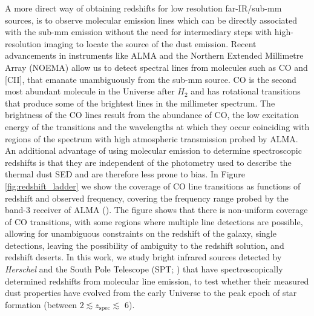 A more direct way of obtaining redshifts for low resolution far-IR/sub-mm sources, is to observe molecular emission lines which can be directly associated with the sub-mm emission without the need for intermediary steps with high-resolution imaging to locate the source of the dust emission. Recent advancements in instruments like ALMA and the Northern Extended Millimetre Array (NOEMA) allow us to detect spectral lines from molecules such as CO and [CII], that emanate unambiguously from the sub-mm source. CO is the second most abundant molecule in the Universe after $H_2$ and has rotational transitions that produce some of the brightest lines in the millimeter spectrum. The brightness of the CO lines result from the abundance of CO, the low excitation energy of the transitions and the wavelengths at which they occur coinciding with regions of the spectrum with high atmospheric transmission probed by ALMA. An additional advantage of using molecular emission to determine spectroscopic redshifts is that they are independent of the photometry used to describe the thermal dust SED and are therefore less prone to bias. In Figure \ref{fig:redshift_ladder} we show the coverage of CO line transitions as functions of redshift and observed frequency, covering the frequency range probed by the band-3 receiver of ALMA (\citealt{Weiss_2013}). The figure shows that there is non-uniform coverage of CO transitions, with some regions where multiple line detections are possible, allowing for unambiguous constraints on the redshift of the galaxy, single detections, leaving the possibility of ambiguity to the redshift solution, and redshift deserts. In this work, we study bright infrared sources detected by \textit{Herschel} and the South Pole Telescope (SPT; \citealt{Carlstrom_2011}) that have spectroscopically determined redshifts from molecular line emission, to test whether their measured dust properties have evolved from the early Universe to the peak epoch of star formation (between $2 \lesssim z_{\textrm{spec}} \lesssim$ 6). 

